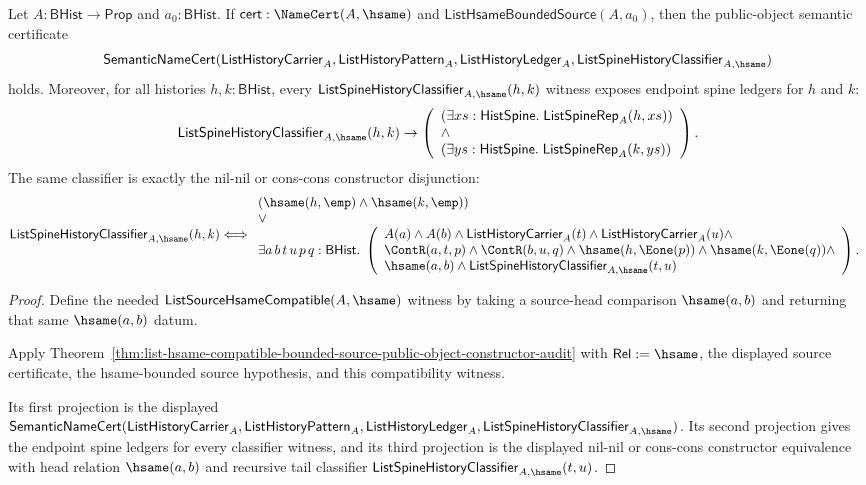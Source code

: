 \begin{theorem}
\label{thm:list-hsame-bounded-source-public-object-constructor-audit}
Let $A:\mathsf{BHist}\to\mathsf{Prop}$ and $a_0:\mathsf{BHist}$. If
$\mathsf{cert}:\NameCert(A,\hsame)$ and
$\mathsf{ListHsameBoundedSource}(A,a_0)$, then the public-object semantic
certificate
$$
\mathsf{SemanticNameCert}(\mathsf{ListHistoryCarrier}_A,
\mathsf{ListHistoryPattern}_A,
\mathsf{ListHistoryLedger}_A,
\mathsf{ListSpineHistoryClassifier}_{A,\hsame})
$$
holds. Moreover, for all histories $h,k:\mathsf{BHist}$, every
$\mathsf{ListSpineHistoryClassifier}_{A,\hsame}(h,k)$ witness exposes endpoint
spine ledgers for $h$ and $k$:
$$
\mathsf{ListSpineHistoryClassifier}_{A,\hsame}(h,k)
\to
\left(
\begin{array}{l}
(\exists xs:\mathsf{HistSpine}.\;\mathsf{ListSpineRep}_A(h,xs))\\
\land\\
(\exists ys:\mathsf{HistSpine}.\;\mathsf{ListSpineRep}_A(k,ys))
\end{array}
\right).
$$
The same classifier is exactly the nil-nil or cons-cons constructor
disjunction:
$$
\mathsf{ListSpineHistoryClassifier}_{A,\hsame}(h,k)
\Longleftrightarrow
\begin{array}{l}
(\hsame(h,\emp)\land \hsame(k,\emp))\\
\lor\\
\exists a\,b\,t\,u\,p\,q:\mathsf{BHist}.\;
\left(
\begin{array}{l}
A(a)\land A(b)\land
\mathsf{ListHistoryCarrier}_A(t)\land
\mathsf{ListHistoryCarrier}_A(u)\land\\
\ContR(a,t,p)\land \ContR(b,u,q)\land
\hsame(h,\Eone(p))\land \hsame(k,\Eone(q))\land\\
\hsame(a,b)\land
\mathsf{ListSpineHistoryClassifier}_{A,\hsame}(t,u)
\end{array}
\right).
\end{array}
$$
\end{theorem}
\begin{proof}
Define the needed
$\mathsf{ListSourceHsameCompatible}(A,\hsame)$ witness by taking a source-head
comparison $\hsame(a,b)$ and returning that same $\hsame(a,b)$ datum.

Apply
Theorem~\ref{thm:list-hsame-compatible-bounded-source-public-object-constructor-audit}
with $\mathsf{Rel}:=\hsame$, the displayed source certificate, the
hsame-bounded source hypothesis, and this compatibility witness.

Its first projection is the displayed
$\mathsf{SemanticNameCert}(\mathsf{ListHistoryCarrier}_A,
\mathsf{ListHistoryPattern}_A,\mathsf{ListHistoryLedger}_A,
\mathsf{ListSpineHistoryClassifier}_{A,\hsame})$. Its second projection gives
the endpoint spine ledgers for every classifier witness, and its third
projection is the displayed nil-nil or cons-cons constructor equivalence with
head relation $\hsame(a,b)$ and recursive tail classifier
$\mathsf{ListSpineHistoryClassifier}_{A,\hsame}(t,u)$.
\end{proof}




